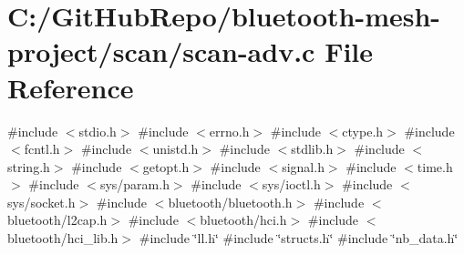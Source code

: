 \hypertarget{scan-adv_8c}{}\section{C\+:/\+Git\+Hub\+Repo/bluetooth-\/mesh-\/project/scan/scan-\/adv.c File Reference}
\label{scan-adv_8c}
{\ttfamily \#include $<$stdio.\+h$>$}\newline
{\ttfamily \#include $<$errno.\+h$>$}\newline
{\ttfamily \#include $<$ctype.\+h$>$}\newline
{\ttfamily \#include $<$fcntl.\+h$>$}\newline
{\ttfamily \#include $<$unistd.\+h$>$}\newline
{\ttfamily \#include $<$stdlib.\+h$>$}\newline
{\ttfamily \#include $<$string.\+h$>$}\newline
{\ttfamily \#include $<$getopt.\+h$>$}\newline
{\ttfamily \#include $<$signal.\+h$>$}\newline
{\ttfamily \#include $<$time.\+h$>$}\newline
{\ttfamily \#include $<$sys/param.\+h$>$}\newline
{\ttfamily \#include $<$sys/ioctl.\+h$>$}\newline
{\ttfamily \#include $<$sys/socket.\+h$>$}\newline
{\ttfamily \#include $<$bluetooth/bluetooth.\+h$>$}\newline
{\ttfamily \#include $<$bluetooth/l2cap.\+h$>$}\newline
{\ttfamily \#include $<$bluetooth/hci.\+h$>$}\newline
{\ttfamily \#include $<$bluetooth/hci\+\_\+lib.\+h$>$}\newline
{\ttfamily \#include \char`\"{}ll.\+h\char`\"{}}\newline
{\ttfamily \#include \char`\"{}structs.\+h\char`\"{}}\newline
{\ttfamily \#include \char`\"{}nb\+\_\+data.\+h\char`\"{}}\newline
